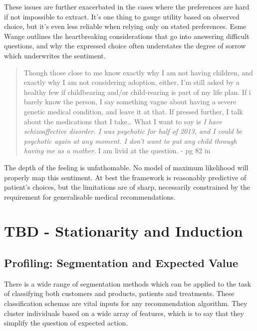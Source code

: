 \documentclass[]{tufte-book}
\theoremstyle{definition}
\theoremstyle{definition}
\theoremstyle{definition}
\theoremstyle{remark}
\begin{document}
These issues are further exacerbated in the cases where the preferences are hard if not impossible to extract. It's one thing to gauge utility based on observed choice, but it's even less reliable when relying only on stated preferences. Esme Wange outlines the heartbreaking considerations that go into answering difficult questions, and why the expressed choice often understates the degree of sorrow which underwrites the sentiment.

\begin{quote}
Though those close to me know exactly why I am not having children, and exactly why I am not considering adoption, either, I'm still asked by a healthy few if childbearing and/or child-rearing is part of my life plan. If i barely know the person, I say something vague about having a severe genetic medical condition, and leave it at that. If pressed further, I talk about the medications that I take\ldots{} What I want to say is \emph{I have schizoaffective disorder. I was psychotic for half of 2013, and I could be psychotic again at any moment. I don't want to put any child through having me as a mother.} I am livid at the question. - pg 82 in \citep{WangSchizophrenia}
\end{quote}

The depth of the feeling is unfathomable. No model of maximum likelihood will properly map this sentiment. At best the framework is reasonably predictive of patient's choices, but the limitations are of sharp, necessarily constrained by the requirement for generalisable medical recommendations.

\hypertarget{tbd---stationarity-and-induction}{%
\chapter{TBD - Stationarity and Induction}\label{tbd---stationarity-and-induction}}

\hypertarget{profiling-segmentation-and-expected-value}{%
\section{Profiling: Segmentation and Expected Value}\label{profiling-segmentation-and-expected-value}}

There is a wide range of segmentation methods which can be applied to the task of classifying both customers and products, patients and treatments. These classification schemas are vital inputs for any recommendation algorithm. They cluster individuals based on a wide array of features, which is to say that they simplify the question of expected action.
\end{document}

